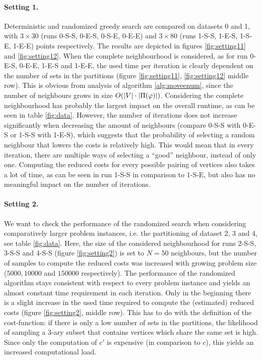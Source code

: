 \paragraph{Setting 1.} Deterministic and randomized greedy search are compared on datasets 0 and 1, with $3 \times 30$ (runs 0-S-S, 0-E-S, 0-S-E, 0-E-E) and $3 \times 80$ (runs 1-S-S, 1-E-S, 1-S-E, 1-E-E) points respectively. The results are depicted in figures \ref{fig:setting11} and \ref{fig:setting12}. When the complete neighbourhood is considered, as for run 0-E-S, 0-E-E, 1-E-S and 1-E-E, the used time per iteration is clearly dependent on the number of sets in the partitions (figure \ref{fig:setting11}, \ref{fig:setting12} middle row). This is obvious from analysis of algorithm \ref{alg:moveenum}, since the number of neighbours grows in size $O(|V| \cdot |\Pi(\varphi)|)$. Considering the complete neighbourhood has probably the largest impact on the overall runtime, as can be seen in table \ref{fig:data}. However, the number of iterations does not increase significantly when decreasing the amount of neighbours (compare 0-S-S with 0-E-S or 1-S-S with 1-E-S), which suggests that the probability of selecting a random neighbour that lowers the costs is relatively high. This would mean that in every iteration, there are multiple ways of selecting a ``good'' neighbour, instead of only one. Computing the reduced costs for every possible pairing of vertices also takes a lot of time, as can be seen in run 1-S-S in comparison to 1-S-E, but also has no meaningful impact on the number of iterations.

\paragraph{Setting 2.} We want to check the performance of the randomized search when considering comparatively larger problem instances, i.e. the partitioning of dataset 2, 3 and 4, see table \ref{fig:data}. Here, the size of the considered neighbourhood for runs 2-S-S, 3-S-S and 4-S-S (figure \ref{fig:setting2}) is set to $N=50$ neighbours, but the number of samples to compute the reduced costs was increased with growing problem size ($5000, 10000$ and $150000$ respectively). The performance of the randomized algorithm stays consistent with respect to every problem instance and yields an almost constant time requirement in each iteration. Only in the beginning there is a slight increase in the used time required to compute the (estimated) reduced costs (figure \ref{fig:setting2}, middle row). This has to do with the definition of the cost-function: if there is only a low number of sets in the partitions, the likelihood of sampling a 3-ary subset that contains vertices which share the same set is high. Since only the computation of $c'$ is expensive (in comparison to $c$), this yields an increased computational load.

